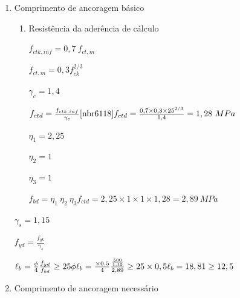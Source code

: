 \begin{resposta}
\begin{enumerate}[start=9]
        

        \begin{enumerate}
            \item Comprimento de ancoragem básico \cite[item 9.4.2.4]{nbr6118}
            
            \begin{enumerate}
                \item Resistência da aderência de cálculo \cite[item 9.3.2]{nbr6118}

                $f_{ctk,inf} = 0,7 \ f_{ct,m}$ \cite[item 8.2.5]{nbr6118}

                $f_{ct,m} = 0,3 f_{ck}^{2/3}$ \cite[item 8.2.5]{nbr6118}

                $\gamma_c = 1,4$ \cite[tabela 12.1]{nbr6118} \newline
                
                $f_{ctd} = \frac{f_{ctk, inf}}{\gamma_c} \text{\cite[tabela 8.2]{nbr6118}} \newline f_{ctd} = \frac{0,7 \times 0,3 \times 25^{2/3}}{1,4} =  1,28 \ MPa$ \newline
                
                $\eta_1 = 2,25$ \cite[tabela 8.2]{nbr6118}
                
                $\eta_2 = 1$ \cite[item 9.3.1]{nbr6118}
                
                $\eta_3 = 1$ \cite[item 9.3.2.1]{nbr6118} \newline
                
                $f_{bd} = \eta_1 \ \eta_2 \ \eta_3 f_{ctd} = 2,25 \times 1 \times 1 \times 1,28 = 2,89 \ MPa$ \newline
            \end{enumerate}

            $\gamma_s = 1,15$ \cite[tabela 12.1]{nbr6118}

            $f_{yd}=\frac{f_{yk}}{\gamma_s}$ \newline

            $\ell_b = \frac{\phi}{4}\frac{f_{yd}}{f_{bd}} \geq 25 \phi \newline \ell_b = \frac{\times 0,5}{4}\frac{\frac{500}{1,15}}{2,89} \geq 25 \times 0,5 \newline \ell_b = 18,81  \geq 12,5$ \newline

            \item Comprimento de ancoragem necessário \cite[item 9.4.2.5]{nbr6118}
            

\end{enumerate}
\end{enumerate}
\end{resposta}
